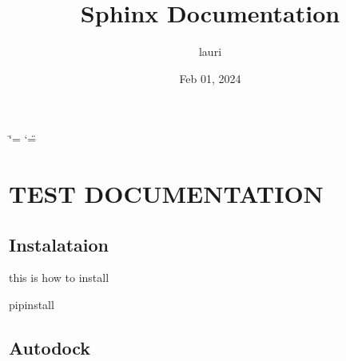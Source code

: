 \documentclass[a4paper,10pt,english,openany, oneside]{sphinxmanual}
\title{Sphinx Documentation}
\date{Feb 01, 2024}
\author{lauri}
\begin{document}
\ifdefined\shorthandoff
  \ifnum\catcode`\=\string=\active\shorthandoff{=}\fi
  \ifnum\catcode`\"=\active{}\fi
\fi

\pagestyle{empty}
\sphinxmaketitle
\pagestyle{plain}
\sphinxtableofcontents
\pagestyle{normal}
\label{\detokenize{index::doc}}


\sphinxstepscope


\chapter{TEST DOCUMENTATION}
\label{\detokenize{test:test-documentation}}\label{\detokenize{test::doc}}

\section{Instalataion}
\label{\detokenize{test:instalataion}}\label{\detokenize{test:installation}}
\sphinxAtStartPar
this is how to install

\begin{sphinxVerbatim}[commandchars=\\\{\}]
 pipinstall
\end{sphinxVerbatim}


\section{Autodock}
\label{\detokenize{test:module-test}}\label{\detokenize{test:autodock}}
\end{document}
